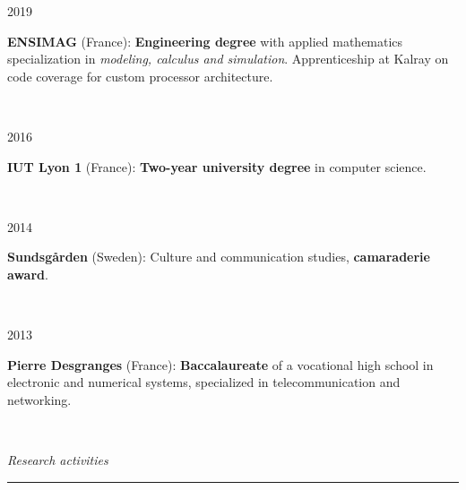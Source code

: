 \documentclass[a4paper,10pt]{article}
\begin{document}
	\noindent
	\begin{minipage}{0.20\textwidth}
		\color{MyGray} 2019
	\end{minipage}
	\hfill
	\begin{minipage}{0.70\textwidth}
		\textbf{ENSIMAG} (France): \textbf{Engineering degree} with applied mathematics specialization in \emph{modeling, calculus and simulation}. Apprenticeship at Kalray on code coverage for custom processor architecture.
	\end{minipage}\\
	\vspace{2mm}
	
	\noindent
	\begin{minipage}{0.20\textwidth}
		\color{MyGray} 2016
	\end{minipage}
	\hfill
	\begin{minipage}{0.70\textwidth}
		\textbf{IUT Lyon 1} (France): \textbf{Two-year university degree} in computer science.
	\end{minipage}\\
	\vspace{2mm}
	
	\noindent
	\begin{minipage}{0.20\textwidth}
		\color{MyGray} 2014
	\end{minipage}
	\hfill
	\begin{minipage}{0.70\textwidth}
		\textbf{Sundsgården} (Sweden): Culture and communication studies, \textbf{camaraderie award}.
	\end{minipage}\\
	\vspace{2mm}
	
	\noindent
	\begin{minipage}{0.20\textwidth}
		\color{MyGray} 2013
	\end{minipage}
	\hfill
	\begin{minipage}{0.70\textwidth}
		\textbf{Pierre Desgranges} (France): \textbf{Baccalaureate} of a vocational high school in electronic and numerical systems, specialized in telecommunication and networking.
	\end{minipage}\\
	\vspace{5mm}
	
	\noindent
	\textit{\Large \color{MyGray} \hspace{5mm} Research activities}
	\vspace{2mm}
	{\color{DefaultGray}\hrule height .1pt}
	\vspace{5mm}
	
\end{document}

